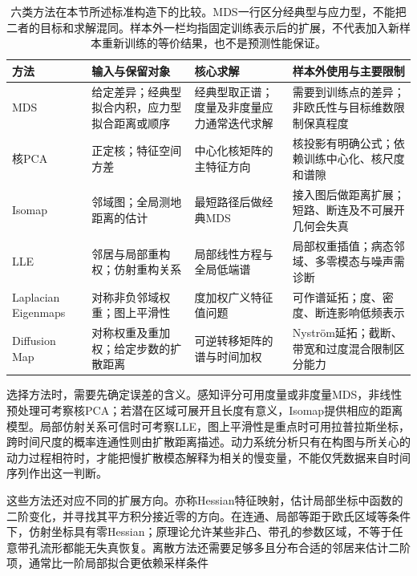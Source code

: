 \begin{table}[htbp]
  \centering
  \small
  \begin{tabularx}{\linewidth}{@{}>{\RaggedRight\arraybackslash}p{22mm}>{\RaggedRight\arraybackslash}X>{\RaggedRight\arraybackslash}X>{\RaggedRight\arraybackslash}X@{}}
    \toprule
    方法 & 输入与保留对象 & 核心求解 & 样本外使用与主要限制 \\
    \midrule
    MDS & 给定差异；经典型拟合内积，应力型拟合距离或顺序
      & 经典型取正谱；度量及非度量应力通常迭代求解
      & 需要到训练点的差异；非欧氏性与目标维数限制保真程度 \\
    核PCA & 正定核；特征空间方差
      & 中心化核矩阵的主特征方向
      & 核投影有明确公式；依赖训练中心化、核尺度和谱隙 \\
    Isomap & 邻域图；全局测地距离的估计
      & 最短路径后做经典MDS
      & 接入图后做距离扩展；短路、断连及不可展开几何会失真 \\
    LLE & 邻居与局部重构权；仿射重构关系
      & 局部线性方程与全局低端谱
      & 局部权重插值；病态邻域、多零模态与噪声需诊断 \\
    Laplacian Eigenmaps & 对称非负邻域权重；图上平滑性
      & 度加权广义特征值问题
      & 可作谱延拓；度、密度、断连影响低频表示 \\
    Diffusion Map & 对称权重及重加权；给定步数的扩散距离
      & 可逆转移矩阵的谱与时间加权
      & Nystr\"om延拓；截断、带宽和过度混合限制区分能力 \\
    \bottomrule
  \end{tabularx}
  \caption{六类方法在本节所述标准构造下的比较。MDS一行区分经典型与应力型，不能把二者的目标和求解混同。样本外一栏均指固定训练表示后的扩展，不代表加入新样本重新训练的等价结果，也不是预测性能保证。}
  \label{tab:dim-manifold-comparison}
\end{table}

选择方法时，需要先确定误差的含义。感知评分可用度量或非度量MDS，非线性预处理可考察核PCA；若潜在区域可展开且长度有意义，Isomap提供相应的距离模型。局部仿射关系可信时可考察LLE，图上平滑性是重点时可用拉普拉斯坐标，跨时间尺度的概率连通性则由扩散距离描述。动力系统分析只有在构图与所关心的动力过程相符时，才能把慢扩散模态解释为相关的慢变量，不能仅凭数据来自时间序列作出这一判断。

这些方法还对应不同的扩展方向。亦称Hessian特征映射，估计局部坐标中函数的二阶变化，并寻找其平方积分接近零的方向。在连通、局部等距于欧氏区域等条件下，仿射坐标具有零Hessian；原理论允许某些非凸、带孔的参数区域，不等于任意带孔流形都能无失真恢复。离散方法还需要足够多且分布合适的邻居来估计二阶项，通常比一阶局部拟合更依赖采样条件

